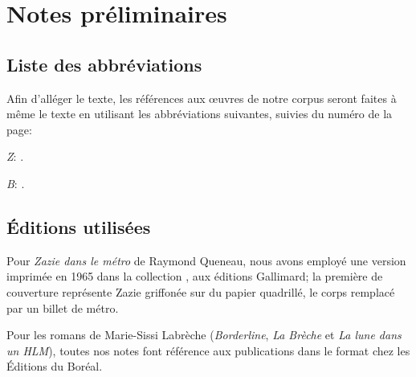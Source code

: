 \newpage

\section*{Notes préliminaires}

\subsection*{Liste des abbréviations}
Afin d'alléger le texte, les références aux \oe{}uvres de notre corpus seront faites à même le texte en utilisant les abbréviations suivantes, suivies du numéro de la page:

\begin{singlespace}
\noindent
\textit{Z}: \cite{Queneau1959}.
\end{singlespace}

\begin{singlespace}
\noindent
\textit{B}: \cite{Labreche2003}.
\end{singlespace}

\subsection*{Éditions utilisées}
Pour \textit{Zazie dans le métro} de Raymond Queneau, nous avons employé une version imprimée en 1965 dans la collection , aux éditions Gallimard; la première de couverture représente Zazie griffonée sur du papier quadrillé, le corps remplacé par un billet de métro.
\bigskip
\par
Pour les romans de Marie-Sissi Labrèche (\textit{Borderline}, \textit{La Brèche} et \textit{La lune dans un HLM}), toutes nos notes font référence aux publications dans le format  chez les Éditions du Boréal.

\newpage
